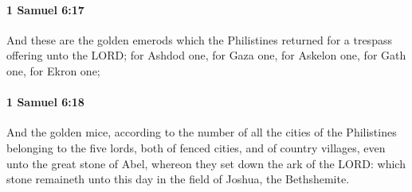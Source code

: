 		\paragraph{1 Samuel 6:17} %
			\label{1SAMUEL-6-17}

			And these are the golden emerods which the Philistines returned for a trespass offering unto the LORD; for Ashdod one, for Gaza one, for Askelon one, for Gath one, for Ekron one;


		\paragraph{1 Samuel 6:18} %
			\label{1SAMUEL-6-18}

			And the golden mice, according to the number of all the cities of the Philistines belonging to the five lords, both of fenced cities, and of country villages, even unto the great stone of Abel, whereon they set down the ark of the LORD: which stone remaineth unto this day in the field of Joshua, the Bethshemite.

